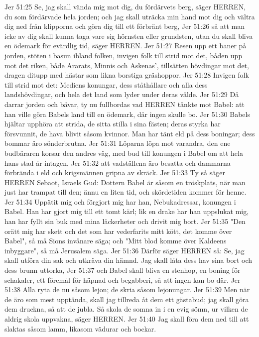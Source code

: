 Jer 51:25  Se, jag skall vända mig mot dig, du fördärvets berg, säger HERREN, du som fördärvade hela jorden; och jag skall uträcka min hand mot dig och vältra dig ned från klipporna och göra dig till ett förbränt berg,
Jer 51:26  så att man icke av dig skall kunna taga vare sig hörnsten eller grundsten, utan du skall bliva en ödemark för evärdlig tid, säger HERREN.
Jer 51:27  Resen upp ett baner på jorden, stöten i basun ibland folken, invigen folk till strid mot det, båden upp mot det riken, både Ararats, Minnis och Askenas', tillsätten hövdingar mot det, dragen ditupp med hästar som likna borstiga gräshoppor.
Jer 51:28  Invigen folk till strid mot det: Mediens konungar, dess ståthållare och alla dess landshövdingar, och hela det land som lyder under deras välde.
Jer 51:29  Då darrar jorden och bävar, ty nu fullbordas vad HERREN tänkte mot Babel: att han ville göra Babels land till en ödemark, där ingen skulle bo.
Jer 51:30  Babels hjältar upphöra att strida, de sitta stilla i sina fästen; deras styrka har försvunnit, de hava blivit såsom kvinnor. Man har tänt eld på dess boningar; dess bommar äro sönderbrutna.
Jer 51:31  Löparna löpa mot varandra, den ene budbäraren korsar den andres väg, med bud till konungen i Babel om att hela hans stad år intagen,
Jer 51:32  att vadställena äro besatta och dammarna förbrända i eld och krigsmännen gripna av skräck.
Jer 51:33  Ty så säger HERREN Sebaot, Israels Gud: Dottern Babel är såsom en tröskplats, när man just har trampat till den; ännu en liten tid, och skördetiden kommer för henne.
Jer 51:34  Uppätit mig och förgjort mig har han, Nebukadressar, konungen i Babel. Han har gjort mig till ett tomt kärl; lik en drake har han uppslukat mig, han har fyllt sin buk med mina läckerheter och drivit mig bort.
Jer 51:35  "Den orätt mig har skett och det som har vederfarits mitt kött, det komme över Babel", så må Sions invånare säga; och "Mitt blod komme över Kaldeens inbyggare", så må Jerusalem säga.
Jer 51:36  Därför säger HERREN så: Se, jag skall utföra din sak och utkräva din hämnd. Jag skall låta dess hav sina bort och dess brunn uttorka,
Jer 51:37  och Babel skall bliva en stenhop, en boning för schakaler, ett föremål för häpnad och begabberi, så att ingen kan bo där.
Jer 51:38  Alla ryta de nu såsom lejon; de skria såsom lejonungar.
Jer 51:39  Men när de äro som mest upptända, skall jag tillreda åt dem ett gästabud; jag skall göra dem druckna, så att de jubla. Så skola de somna in i en evig sömn, ur vilken de aldrig skola uppvakna, säger HERREN.
Jer 51:40  Jag skall föra dem ned till att slaktas såsom lamm, likasom vädurar och bockar.
